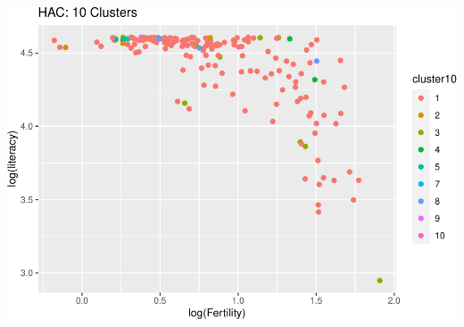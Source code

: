\documentclass[]{article}
\begin{document}
\includegraphics{eda_files/figure-latex/unnamed-chunk-30-10.pdf}
\end{document}
